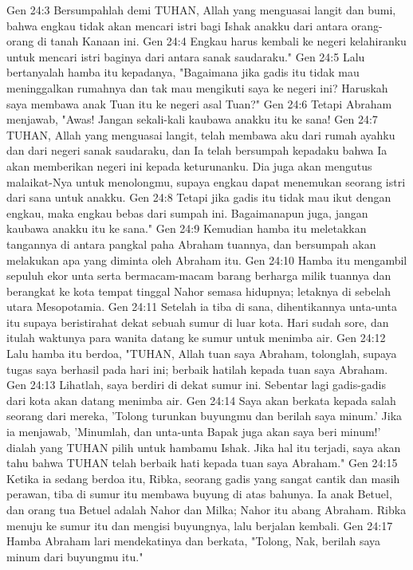 Gen 24:3  Bersumpahlah demi TUHAN, Allah yang menguasai langit dan bumi, bahwa engkau tidak akan mencari istri bagi Ishak anakku dari antara orang-orang di tanah Kanaan ini.
Gen 24:4  Engkau harus kembali ke negeri kelahiranku untuk mencari istri baginya dari antara sanak saudaraku."
Gen 24:5  Lalu bertanyalah hamba itu kepadanya, "Bagaimana jika gadis itu tidak mau meninggalkan rumahnya dan tak mau mengikuti saya ke negeri ini? Haruskah saya membawa anak Tuan itu ke negeri asal Tuan?"
Gen 24:6  Tetapi Abraham menjawab, "Awas! Jangan sekali-kali kaubawa anakku itu ke sana!
Gen 24:7  TUHAN, Allah yang menguasai langit, telah membawa aku dari rumah ayahku dan dari negeri sanak saudaraku, dan Ia telah bersumpah kepadaku bahwa Ia akan memberikan negeri ini kepada keturunanku. Dia juga akan mengutus malaikat-Nya untuk menolongmu, supaya engkau dapat menemukan seorang istri dari sana untuk anakku.
Gen 24:8  Tetapi jika gadis itu tidak mau ikut dengan engkau, maka engkau bebas dari sumpah ini. Bagaimanapun juga, jangan kaubawa anakku itu ke sana."
Gen 24:9  Kemudian hamba itu meletakkan tangannya di antara pangkal paha Abraham tuannya, dan bersumpah akan melakukan apa yang diminta oleh Abraham itu.
Gen 24:10  Hamba itu mengambil sepuluh ekor unta serta bermacam-macam barang berharga milik tuannya dan berangkat ke kota tempat tinggal Nahor semasa hidupnya; letaknya di sebelah utara Mesopotamia.
Gen 24:11  Setelah ia tiba di sana, dihentikannya unta-unta itu supaya beristirahat dekat sebuah sumur di luar kota. Hari sudah sore, dan itulah waktunya para wanita datang ke sumur untuk menimba air.
Gen 24:12  Lalu hamba itu berdoa, "TUHAN, Allah tuan saya Abraham, tolonglah, supaya tugas saya berhasil pada hari ini; berbaik hatilah kepada tuan saya Abraham.
Gen 24:13  Lihatlah, saya berdiri di dekat sumur ini. Sebentar lagi gadis-gadis dari kota akan datang menimba air.
Gen 24:14  Saya akan berkata kepada salah seorang dari mereka, 'Tolong turunkan buyungmu dan berilah saya minum.' Jika ia menjawab, 'Minumlah, dan unta-unta Bapak juga akan saya beri minum!' dialah yang TUHAN pilih untuk hambamu Ishak. Jika hal itu terjadi, saya akan tahu bahwa TUHAN telah berbaik hati kepada tuan saya Abraham."
Gen 24:15  Ketika ia sedang berdoa itu, Ribka, seorang gadis yang sangat cantik dan masih perawan, tiba di sumur itu membawa buyung di atas bahunya. Ia anak Betuel, dan orang tua Betuel adalah Nahor dan Milka; Nahor itu abang Abraham. Ribka menuju ke sumur itu dan mengisi buyungnya, lalu berjalan kembali.
Gen 24:17  Hamba Abraham lari mendekatinya dan berkata, "Tolong, Nak, berilah saya minum dari buyungmu itu."
